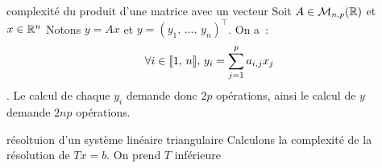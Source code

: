 \begin{exemple}{}{complexité du produit d'une matrice avec un vecteur}
    Soit $A \in \mathcal{M}_{n,p}(\mathbb{R})$ et $x \in \mathbb{R}^n$
    Notons $y = Ax$ et $y = (y_1,\, \dots,\, y_n)^\top$. On a~:
    $$\forall i \in \llbracket 1 ,\, n \rrbracket,\, y_i = \sum_{j=1}^p a_{i,j} x_j$$.
    Le calcul de chaque $y_i$ demande donc $2p$ opérations, ainsi le calcul de $y$ demande $2np$ opérations.
    
\end{exemple}

\begin{exemple}{}{résoltuion d'un système linéaire triangulaire}
    Calculons la complexité de la résolution de $Tx = b$. On prend $T$ inférieure
\end{exemple}



